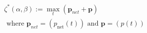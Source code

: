 \begin{equation}
\begin{split}
	\zeta^*(\alpha,\beta) := \max_t(\textbf{p}_{net} + \textbf{p})\\
	\text{ where } \textbf{p}_{net} = (p_\text{net}(t)) \text{ and } \textbf{p} = (p(t))
\end{split}
\label{ch2:equ:dynamic-cost}
\end{equation}